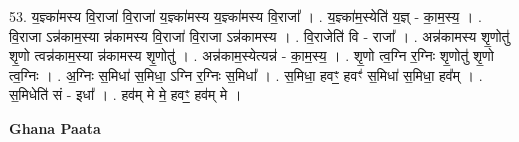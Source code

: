 \documentclass[17pt]{extarticle}
\begin{document}
53. य॒ज्ञ्का॑मस्य वि॒राजा॑ वि॒राजा॑ य॒ज्ञ्का॑मस्य य॒ज्ञ्का॑मस्य वि॒राजा᳚ । . य॒ज्ञ्का॑म॒स्येति॑ य॒ज्ञ् - का॒म॒स्य॒ । . वि॒राजा ऽन्न॑काम॒स्या न्न॑कामस्य वि॒राजा॑ वि॒राजा ऽन्न॑कामस्य । . वि॒राजेति॑ वि - राजा᳚ । . अन्न॑कामस्य शृ॒णोतु॑ शृ॒णो त्वन्न॑काम॒स्या न्न॑कामस्य शृ॒णोतु॑ । . अन्न॑काम॒स्येत्यन्न॑ - का॒म॒स्य॒ । . शृ॒णो त्व॒ग्नि र॒ग्निः शृ॒णोतु॑ शृ॒णो त्व॒ग्निः । . अ॒ग्निः स॒मिधा॑ स॒मिधा॒ ऽग्नि र॒ग्निः स॒मिधा᳚ । . स॒मिधा॒ हवꣳ॒॒ हवꣳ॑ स॒मिधा॑ स॒मिधा॒ हव᳚म् । . स॒मिधेति॑ सं - इधा᳚ । . हव॑म् मे मे॒ हवꣳ॒॒ हव॑म् मे । \newline

\textbf{Ghana Paata } \newline
\end{document}
